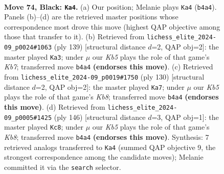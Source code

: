 \documentclass[11pt]{article}
\begin{document}
\clearpage

\begin{figure}[p]\centering
\begin{subfigure}{0.46\textwidth}\centering
\resizebox{\linewidth}{!}{%
\newchessgame
\chessboard[
  setfen={8/6P1/4P3/7P/1k6/6Q1/4K3/8 b - - 6 74},
  showmover=false,
  pgfstyle=straightmove, color=movearrow, markmove={b4-a4}
]}
\caption{}
\end{subfigure}\hfill
\begin{subfigure}{0.46\textwidth}\centering
\resizebox{\linewidth}{!}{%
\newchessgame
\chessboard[
  setfen={8/2Q5/8/8/5P2/3K4/1k5P/8 b - - 0 70},
  showmover=false,
  pgfstyle=straightmove, color=movearrow, markmove={b2-a3}
]}
\caption{}
\end{subfigure}
\\[4pt]
\begin{subfigure}{0.46\textwidth}\centering
\resizebox{\linewidth}{!}{%
\newchessgame
\chessboard[
  setfen={1K6/4k3/2q5/7p/8/5p2/8/8 w - - 2 66},
  showmover=false,
  pgfstyle=straightmove, color=movearrow, markmove={b8-a7}
]}
\caption{}
\end{subfigure}\hfill
\begin{subfigure}{0.46\textwidth}\centering
\resizebox{\linewidth}{!}{%
\newchessgame
\chessboard[
  setfen={1K6/4q3/2k3p1/4p3/8/8/8/8 w - - 6 74},
  showmover=false,
  pgfstyle=straightmove, color=movearrow, markmove={b8-c8}
]}
\caption{}
\end{subfigure}
\caption{\textbf{Move 74, Black: \texttt{Ka4}.} (a) Our position; Melanie plays \texttt{Ka4} (\texttt{b4a4}). Panels (b)--(d) are the retrieved master positions whose correspondence most drove this move (highest QAP objective among those that transfer to it). (b) Retrieved from \texttt{lichess\_elite\_2024-09\_p0024\#1063} (ply 139) [structural distance $d$=2, QAP obj=2]: the master played \texttt{Ka3}; under $\mu$ our \emph{Kb5} plays the role of that game's \emph{Kb7}; transferred move \texttt{b4a4} \textbf{(endorses this move)}. (c) Retrieved from \texttt{lichess\_elite\_2024-09\_p0019\#1750} (ply 130) [structural distance $d$=2, QAP obj=2]: the master played \texttt{Ka7}; under $\mu$ our \emph{Kb5} plays the role of that game's \emph{Kb8}; transferred move \texttt{b4a4} \textbf{(endorses this move)}. (d) Retrieved from \texttt{lichess\_elite\_2024-09\_p0005\#1425} (ply 146) [structural distance $d$=3, QAP obj=1]: the master played \texttt{Kc8}; under $\mu$ our \emph{Kb5} plays the role of that game's \emph{Kb8}; transferred move \texttt{b4a4} \textbf{(endorses this move)}. Synthesis: 7 retrieved analogs transferred to \texttt{Ka4} (summed QAP objective 9, the strongest correspondence among the candidate moves); Melanie committed it via the \texttt{search} selector.}
\label{fig:thought-m147}
\end{figure}
\end{document}
